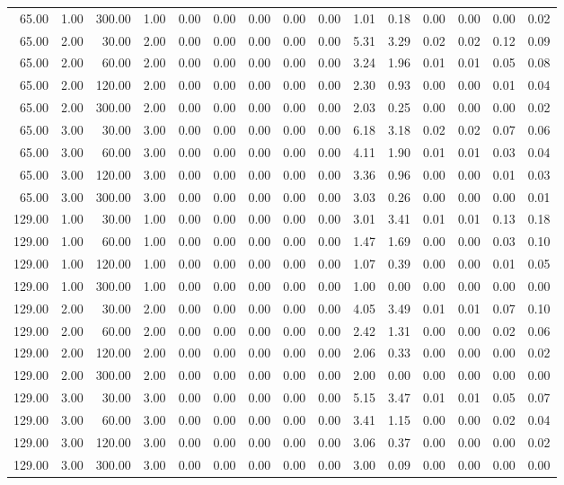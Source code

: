 \begin{table}[ht]
\begin{tabular}{rrrrrrrrrrrrrrr}
  65.00 & 1.00 & 300.00 & 1.00 & 0.00 & 0.00 & 0.00 & 0.00 & 0.00 & 1.01 & 0.18 & 0.00 & 0.00 & 0.00 & 0.02 \\ 
  65.00 & 2.00 & 30.00 & 2.00 & 0.00 & 0.00 & 0.00 & 0.00 & 0.00 & 5.31 & 3.29 & 0.02 & 0.02 & 0.12 & 0.09 \\ 
  65.00 & 2.00 & 60.00 & 2.00 & 0.00 & 0.00 & 0.00 & 0.00 & 0.00 & 3.24 & 1.96 & 0.01 & 0.01 & 0.05 & 0.08 \\ 
  65.00 & 2.00 & 120.00 & 2.00 & 0.00 & 0.00 & 0.00 & 0.00 & 0.00 & 2.30 & 0.93 & 0.00 & 0.00 & 0.01 & 0.04 \\ 
  65.00 & 2.00 & 300.00 & 2.00 & 0.00 & 0.00 & 0.00 & 0.00 & 0.00 & 2.03 & 0.25 & 0.00 & 0.00 & 0.00 & 0.02 \\ 
  65.00 & 3.00 & 30.00 & 3.00 & 0.00 & 0.00 & 0.00 & 0.00 & 0.00 & 6.18 & 3.18 & 0.02 & 0.02 & 0.07 & 0.06 \\ 
  65.00 & 3.00 & 60.00 & 3.00 & 0.00 & 0.00 & 0.00 & 0.00 & 0.00 & 4.11 & 1.90 & 0.01 & 0.01 & 0.03 & 0.04 \\ 
  65.00 & 3.00 & 120.00 & 3.00 & 0.00 & 0.00 & 0.00 & 0.00 & 0.00 & 3.36 & 0.96 & 0.00 & 0.00 & 0.01 & 0.03 \\ 
  65.00 & 3.00 & 300.00 & 3.00 & 0.00 & 0.00 & 0.00 & 0.00 & 0.00 & 3.03 & 0.26 & 0.00 & 0.00 & 0.00 & 0.01 \\ 
  129.00 & 1.00 & 30.00 & 1.00 & 0.00 & 0.00 & 0.00 & 0.00 & 0.00 & 3.01 & 3.41 & 0.01 & 0.01 & 0.13 & 0.18 \\ 
  129.00 & 1.00 & 60.00 & 1.00 & 0.00 & 0.00 & 0.00 & 0.00 & 0.00 & 1.47 & 1.69 & 0.00 & 0.00 & 0.03 & 0.10 \\ 
  129.00 & 1.00 & 120.00 & 1.00 & 0.00 & 0.00 & 0.00 & 0.00 & 0.00 & 1.07 & 0.39 & 0.00 & 0.00 & 0.01 & 0.05 \\ 
  129.00 & 1.00 & 300.00 & 1.00 & 0.00 & 0.00 & 0.00 & 0.00 & 0.00 & 1.00 & 0.00 & 0.00 & 0.00 & 0.00 & 0.00 \\ 
  129.00 & 2.00 & 30.00 & 2.00 & 0.00 & 0.00 & 0.00 & 0.00 & 0.00 & 4.05 & 3.49 & 0.01 & 0.01 & 0.07 & 0.10 \\ 
  129.00 & 2.00 & 60.00 & 2.00 & 0.00 & 0.00 & 0.00 & 0.00 & 0.00 & 2.42 & 1.31 & 0.00 & 0.00 & 0.02 & 0.06 \\ 
  129.00 & 2.00 & 120.00 & 2.00 & 0.00 & 0.00 & 0.00 & 0.00 & 0.00 & 2.06 & 0.33 & 0.00 & 0.00 & 0.00 & 0.02 \\ 
  129.00 & 2.00 & 300.00 & 2.00 & 0.00 & 0.00 & 0.00 & 0.00 & 0.00 & 2.00 & 0.00 & 0.00 & 0.00 & 0.00 & 0.00 \\ 
  129.00 & 3.00 & 30.00 & 3.00 & 0.00 & 0.00 & 0.00 & 0.00 & 0.00 & 5.15 & 3.47 & 0.01 & 0.01 & 0.05 & 0.07 \\ 
  129.00 & 3.00 & 60.00 & 3.00 & 0.00 & 0.00 & 0.00 & 0.00 & 0.00 & 3.41 & 1.15 & 0.00 & 0.00 & 0.02 & 0.04 \\ 
  129.00 & 3.00 & 120.00 & 3.00 & 0.00 & 0.00 & 0.00 & 0.00 & 0.00 & 3.06 & 0.37 & 0.00 & 0.00 & 0.00 & 0.02 \\ 
  129.00 & 3.00 & 300.00 & 3.00 & 0.00 & 0.00 & 0.00 & 0.00 & 0.00 & 3.00 & 0.09 & 0.00 & 0.00 & 0.00 & 0.00 \\ 
   \hline
\end{tabular}
\end{table}
